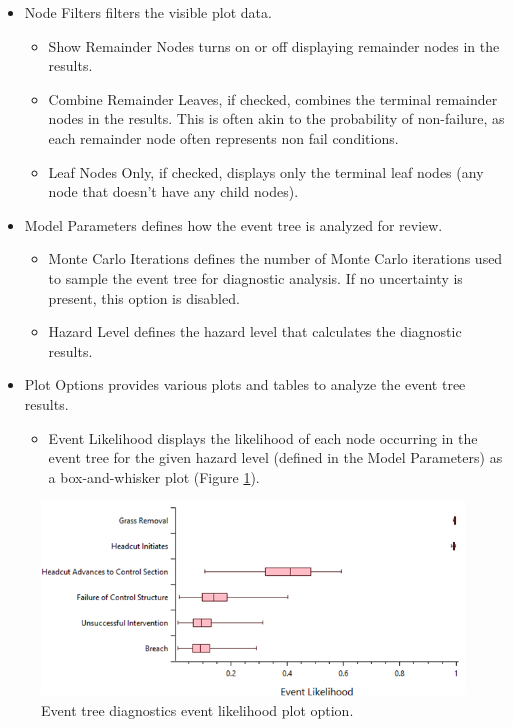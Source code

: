 \documentclass[
]{book}
\providecommand{\tightlist}{%
  \setlength{\itemsep}{0pt}\setlength{\parskip}{0pt}}
\begin{document}
\begin{itemize}
\item
  Node Filters filters the visible plot data.

  \begin{itemize}
  \item
    Show Remainder Nodes turns on or off displaying remainder nodes in the results.
  \item
    Combine Remainder Leaves, if checked, combines the terminal remainder nodes in the results. This is often akin to the probability of non-failure, as each remainder node often represents non fail conditions.
  \item
    Leaf Nodes Only, if checked, displays only the terminal leaf nodes (any node that doesn't have any child nodes).
  \end{itemize}
\item
  Model Parameters defines how the event tree is analyzed for review.

  \begin{itemize}
  \item
    Monte Carlo Iterations defines the number of Monte Carlo iterations used to sample the event tree for diagnostic analysis. If no uncertainty is present, this option is disabled.
  \item
    Hazard Level defines the hazard level that calculates the diagnostic results.
  \end{itemize}
\item
  Plot Options provides various plots and tables to analyze the event tree results.

  \begin{itemize}
  \tightlist
  \item
    Event Likelihood displays the likelihood of each node occurring in the event tree for the given hazard level (defined in the Model Parameters) as a box-and-whisker plot (Figure \ref{fig:figure-94}).
  \end{itemize}
\end{itemize}

\begin{figure}

{\centering \includegraphics{images/figure94} 

}

\caption{Event tree diagnostics event likelihood plot option.}\label{fig:figure-94}
\end{figure}
\end{document}

